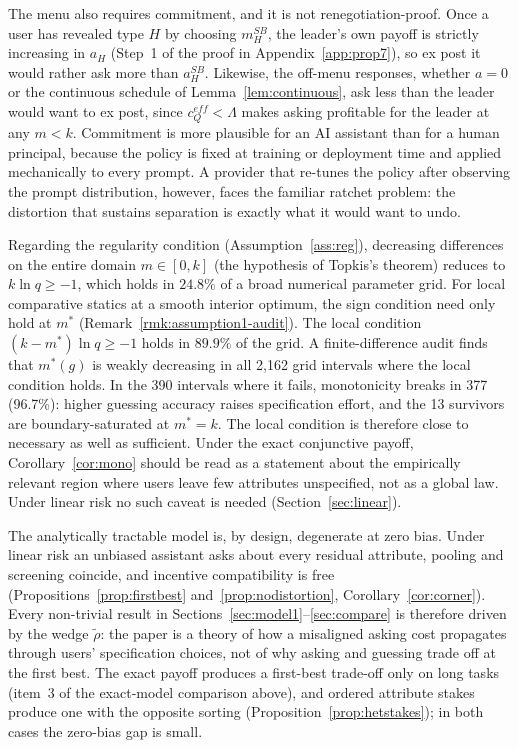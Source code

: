 \documentclass[11pt]{article}
\begin{document}
The menu also requires commitment, and it is not renegotiation-proof. Once a user has revealed type $H$ by choosing $m_H^{SB}$, the leader's own payoff is strictly increasing in $a_H$ (Step~1 of the proof in Appendix~\ref{app:prop7}), so ex post it would rather ask more than $a_H^{SB}$. Likewise, the off-menu responses, whether $a = 0$ or the continuous schedule of Lemma~\ref{lem:continuous}, ask less than the leader would want to ex post, since $c_Q^{eff} < \Lambda$ makes asking profitable for the leader at any $m < k$. Commitment is more plausible for an AI assistant than for a human principal, because the policy is fixed at training or deployment time and applied mechanically to every prompt. A provider that re-tunes the policy after observing the prompt distribution, however, faces the familiar ratchet problem: the distortion that sustains separation is exactly what it would want to undo.

Regarding the regularity condition (Assumption~\ref{ass:reg}), decreasing differences on the entire domain $m \in [0, k]$ (the hypothesis of Topkis's theorem) reduces to $k \ln q \ge -1$, which holds in $24.8\%$ of a broad numerical parameter grid. For local comparative statics at a smooth interior optimum, the sign condition need only hold at $m^*$ (Remark~\ref{rmk:assumption1-audit}). The local condition $(k - m^*)\ln q \ge -1$ holds in $89.9\%$ of the grid. A finite-difference audit finds that $m^*(g)$ is weakly decreasing in all 2{,}162 grid intervals where the local condition holds. In the 390 intervals where it fails, monotonicity breaks in 377 (96.7\%): higher guessing accuracy raises specification effort, and the 13 survivors are boundary-saturated at $m^* = k$. The local condition is therefore close to necessary as well as sufficient. Under the exact conjunctive payoff, Corollary~\ref{cor:mono} should be read as a statement about the empirically relevant region where users leave few attributes unspecified, not as a global law. Under linear risk no such caveat is needed (Section~\ref{sec:linear}).

The analytically tractable model is, by design, degenerate at zero bias. Under linear risk an unbiased assistant asks about every residual attribute, pooling and screening coincide, and incentive compatibility is free (Propositions~\ref{prop:firstbest} and~\ref{prop:nodistortion}, Corollary~\ref{cor:corner}). Every non-trivial result in Sections~\ref{sec:model1}--\ref{sec:compare} is therefore driven by the wedge $\tilde\rho$: the paper is a theory of how a misaligned asking cost propagates through users' specification choices, not of why asking and guessing trade off at the first best. The exact payoff produces a first-best trade-off only on long tasks (item~3 of the exact-model comparison above), and ordered attribute stakes produce one with the opposite sorting (Proposition~\ref{prop:hetstakes}); in both cases the zero-bias gap is small.
\end{document}

